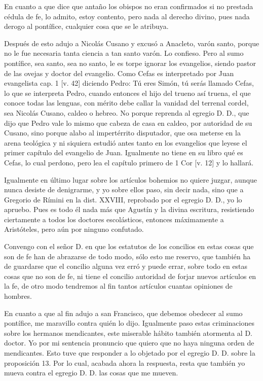 En cuanto a que dice que antaño los obispos no eran confirmados si no prestada cédula de fe, lo admito, estoy contento, pero nada al derecho divino, pues nada derogo al pontífice, cualquier cosa que se le atribuya.

Después de esto adujo a Nicolás Cusano y excusó a Anacleto, varón santo, porque no le fue necesaria tanta ciencia a tan santo varón. Lo confieso. Pero al sumo pontífice, sea santo, sea no santo, le es torpe ignorar los evangelios, siendo pastor de las ovejas y doctor del evangelio. Como Cefas es interpretado por Juan evangelista cap. 1 [v. 42] diciendo Pedro: Tú eres Simón, tú \marginpar{\small[303]} serás llamado Cefas, lo que se interpreta Pedro, cuando entonces el hijo del trueno así truena, el que conoce todas las lenguas, con mérito debe callar la vanidad del terrenal cordel, sea Nicolás Cusano, caldeo o hebreo. No porque reprenda al egregio D. D., que dijo que Pedro vale lo mismo que cabeza de casa en caldeo, por autoridad de su Cusano, sino porque alabo al impertérrito disputador, que osa meterse en la arena teológica y ni siquiera estudió antes tanto en los evangelios que leyese el primer capítulo del evangelio de Juan. Igualmente no tiene en su libro qué es Cefas, lo cual perdono, pero lea el capítulo primero de 1 Cor [v. 12] y lo hallará.

Igualmente en último lugar sobre los artículos bohemios no quiere juzgar, aunque nunca desiste de denigrarme, y yo sobre ellos paso, sin decir nada, sino que a Gregorio de Rímini en la dist. XXVIII, reprobado por el egregio D. D., yo lo apruebo. Pues es todo él nada más que Agustín y la divina escritura, resistiendo ciertamente a todos los doctores escolásticos, entonces máximamente a Aristóteles, pero aún por ninguno confutado.

Convengo con el señor D. en que los estatutos de los concilios en estas cosas que son de fe han de abrazarse de todo modo, sólo esto me reservo, que también ha de guardarse que el concilio alguna vez erró y puede errar, sobre todo en estas cosas que no son de fe, ni tiene el concilio autoridad de forjar nuevos artículos en la fe, de otro modo tendremos al fin tantos artículos cuantas opiniones de hombres.

En cuanto a que al fin adujo a san Francisco, que debemos obedecer al sumo pontífice, me maravillo contra quién lo dijo. Igualmente paso estas criminaciones sobre los hermanos mendicantes, este miserable hábito también atormenta al D. doctor. Yo por mi sentencia pronuncio que quiero que no haya ninguna orden de mendicantes. Esto tuve que responder a lo objetado por el egregio D. D. sobre la proposición 13. Por lo cual, acabada ahora la respuesta, resta que también yo mueva contra el egregio D. D. las cosas que me mueven.

